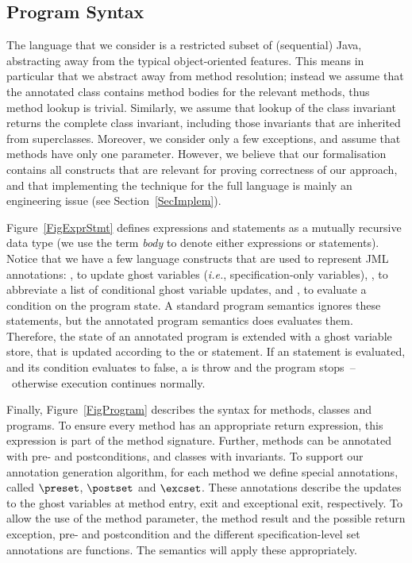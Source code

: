 \subsection{Program Syntax}\label{SecSyntax}

The language that we consider is a restricted subset of (sequential)
Java, abstracting away from the typical object-oriented features. This
means in particular that we abstract away from method resolution;
instead we assume that the annotated class contains method bodies for
the relevant methods, thus method lookup is trivial. Similarly, we
assume that lookup of the class invariant returns the complete class
invariant, including those invariants that are inherited from
superclasses. Moreover, we consider only a few exceptions, and assume
that methods have only one parameter. However, we believe that our
formalisation contains all constructs that are relevant for proving
correctness of our approach, and that implementing the technique for
the full language is mainly an engineering issue (see
Section~\ref{SecImplem}).


Figure~\ref{FigExprStmt} defines expressions and statements as a
mutually recursive data type (we use the term \emph{body} to denote
either expressions or statements). Notice that we have a few language
constructs that are used to represent JML annotations: \Set, to update
ghost variables (\emph{i.e.}, specification-only variables), \CaseJML,
to abbreviate a list of conditional ghost variable updates, and
\Assert, to evaluate a condition on the program state. A standard
program semantics ignores these statements, but the annotated program
semantics does evaluates them. Therefore, the state of an annotated
program is extended with a ghost variable store, that is updated
according to the \Set or
\CaseJML statement. If an \Assert statement is evaluated, and its
condition evaluates to false, a \JMLExc is throw and the program
stops~--~otherwise execution continues normally.


Finally, Figure~\ref{FigProgram} describes the syntax for methods,
classes and programs. To ensure every method has an appropriate return
expression, this expression is part of the method signature.  Further,
methods can be annotated with pre- and postconditions, and classes
with invariants. To support our annotation generation algorithm, for
each method we define special annotations, called
\(\preset\), \(\postset\) and \(\excset\). These annotations describe
the updates to the ghost variables at method entry, exit and
exceptional exit, respectively. To allow the use of the method
parameter, the method result and the possible return exception, pre-
and postcondition and the different specification-level set
annotations are functions. The semantics will apply these
appropriately.

